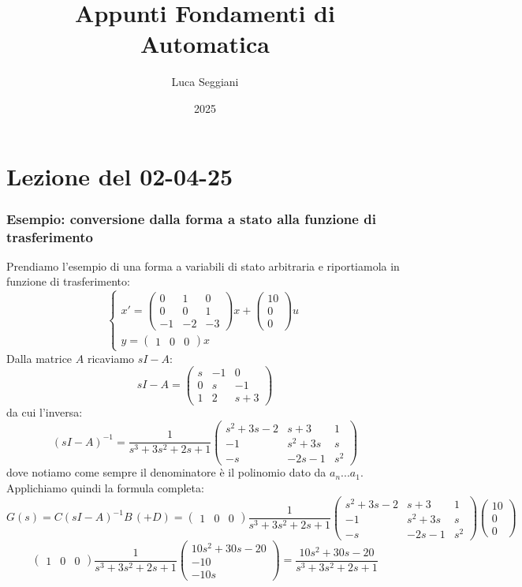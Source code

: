 \documentclass[a4paper,11pt]{article}
\title{Appunti Fondamenti di Automatica}
\author{Luca Seggiani}
\date{2025}
\begin{document}
\section{Lezione del 02-04-25}

\thispagestyle{empty}
\pagestyle{fancy}

\subsubsection{Esempio: conversione dalla forma a stato alla funzione di trasferimento}
Prendiamo l'esempio di una forma a variabili di stato arbitraria e riportiamola in funzione di trasferimento:
\[
	\begin{cases}
		x' = 
		\begin{pmatrix}
			0 & 1 & 0 \\ 0 & 0 & 1 \\ -1 & -2 & -3
		\end{pmatrix}
		x +
		\begin{pmatrix}
			10 \\ 0 \\ 0
		\end{pmatrix}
		u \\ 
		y =
		\begin{pmatrix}
			1 & 0 & 0
		\end{pmatrix}
		x
	\end{cases}
\]
Dalla matrice $A$ ricaviamo $sI - A$:
$$
sI - A =
\begin{pmatrix}
	s & -1 & 0 \\
	0 & s & -1 \\ 
	1 & 2 & s + 3
\end{pmatrix}
$$
da cui l'inversa:
$$
(sI - A)^{-1} =
\frac{1}{s^3 + 3s^2 + 2s + 1}
\begin{pmatrix}
	s^2 + 3s - 2 & s + 3 & 1 \\ 
	-1 & s^2 + 3s & s \\ 
	-s & -2s - 1 & s^2
\end{pmatrix}
$$
dove notiamo come sempre il denominatore è il polinomio dato da $a_n ... a_1$.
Applichiamo quindi la formula completa:
$$
G(s) = C (sI - A)^{-1} B \, ( + D ) = 
\begin{pmatrix}
	1 & 0 & 0
\end{pmatrix}
\frac{1}{s^3 + 3s^2 + 2s + 1}
\begin{pmatrix}
	s^2 + 3s - 2 & s + 3 & 1 \\ 
	-1 & s^2 + 3s & s \\ 
	-s & -2s - 1 & s^2
\end{pmatrix}
\begin{pmatrix}
	10 \\ 0 \\ 0
\end{pmatrix}
$$
$$
\begin{pmatrix}
	1 & 0 & 0
\end{pmatrix}
\frac{1}{s^3 + 3s^2 + 2s + 1}
\begin{pmatrix}
	10s^2 + 30s - 20 \\ 
	-10 \\
	-10s
\end{pmatrix}
= \frac{10s^2 + 30s - 20}{s^3 + 3s^2 + 2s + 1}
$$
\end{document}
